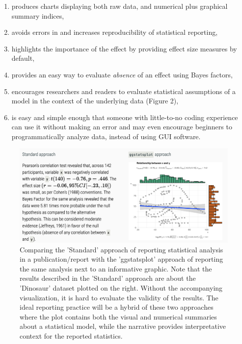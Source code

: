 \documentclass[10pt,a4paper,onecolumn]{article}
\begin{document}
\begin{enumerate}
\def\labelenumi{\alph{enumi}.}
\item
  produces charts displaying both raw data, and numerical plus graphical
  summary indices,
\item
  avoids errors in and increases reproducibility of statistical
  reporting,
\item
  highlights the importance of the effect by providing effect size
  measures by default,
\item
  provides an easy way to evaluate \emph{absence} of an effect using
  Bayes factors,
\item
  encourages researchers and readers to evaluate statistical assumptions
  of a model in the context of the underlying data (Figure 2),
\item
  is easy and simple enough that someone with little-to-no coding
  experience can use it without making an error and may even encourage
  beginners to programmatically analyze data, instead of using GUI
  software.
\end{enumerate}

\begin{figure}
\includegraphics[width=1\linewidth]{reporting} \caption{Comparing the 'Standard' approach of reporting statistical analysis in a publication/report with the 'ggstatsplot' approach of reporting the same analysis next to an informative graphic. Note that the results described in the 'Standard' approach are about the 'Dinosaur' dataset plotted on the right. Without the accompanying visualization, it is hard to evaluate the validity of the results. The ideal reporting practice will be a hybrid of these two approaches where the plot contains both the visual and numerical summaries about a statistical model, while the narrative provides interpretative context for the reported statistics.}\label{fig:reporting}
\end{figure}
\end{document}
